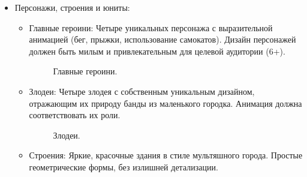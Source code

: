 \documentclass[article,12pt, fleqn]{article}
\begin{document}
\begin{itemize}
\begin{itemize}
    \item Персонажи, строения и юниты:
    \begin{itemize}
        \item Главные героини: Четыре уникальных персонажа с выразительной анимацией (бег, прыжки, использование самокатов). Дизайн персонажей должен быть милым и привлекательным для целевой аудитории (6+).
        \begin{figure}[ht]
            \centering
            \begin{minipage}[b]{0.25\textwidth}
            \end{minipage}\hfill
            \begin{minipage}[b]{0.25\textwidth}
            \end{minipage}\hfill
            \begin{minipage}[b]{0.25\textwidth}
            \end{minipage}\hfill
            \begin{minipage}[b]{0.25\textwidth}
            \end{minipage}\hfill
            \caption{Главные героини.}
        \end{figure}
        \item Злодеи: Четыре злодея с собственным уникальным дизайном, отражающим их природу банды из маленького городка. Анимация должна соответствовать их роли.
        \begin{figure}[ht]
            \centering
            \begin{minipage}[b]{0.25\textwidth}
            \end{minipage}\hfill
            \begin{minipage}[b]{0.25\textwidth}
            \end{minipage}\hfill
            \begin{minipage}[b]{0.25\textwidth}
            \end{minipage}\hfill
            \begin{minipage}[b]{0.25\textwidth}
            \end{minipage}\hfill
            \caption{Злодеи.}
        \end{figure}
        \item Строения: Яркие, красочные здания в стиле мультяшного города. Простые геометрические формы, без излишней детализации.


\end{itemize}
\end{itemize}
\end{itemize}
\end{document}
